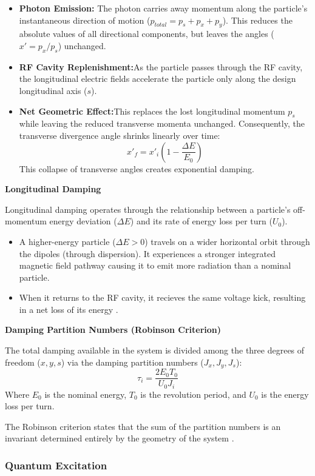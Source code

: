 \documentclass{article}
\begin{document}
\begin{itemize}
\item \textbf{Photon Emission:} The photon carries away momentum along the particle's instantaneous direction of motion ($p_{total}=p_s+p_x+p_y$). This reduces the absolute values of all directional components, but leaves the angles ($x'=p_x/p_s$) unchanged.
\item \textbf{RF Cavity Replenishment:}As the particle passes through the RF cavity, the longitudinal electric fields accelerate the particle only along the design longitudinal axis ($s$).
\item \textbf{Net Geometric Effect:}This replaces the lost longitudinal momentum $p_s$ while leaving the reduced transverse momenta unchanged. Consequently, the transverse divergence angle shrinks linearly over time: $$x'_f=x'_i(1-\frac{\Delta E}{E_0})$$ This collapse of transverse angles creates exponential damping. \cite{Wolski2014}
\end{itemize}

\textbf{Longitudinal Damping}


Longitudinal damping operates through the relationship between a particle's off-momentum energy deviation ($\Delta E$) and its rate of energy loss per turn ($U_0$).
\begin{itemize}
\item A higher-energy particle ($\Delta E > 0$) travels on a wider horizontal orbit through the dipoles (through dispersion). It experiences a stronger integrated magnetic field pathway causing it to emit more radiation than a nominal particle.
\item When it returns to the RF cavity, it recieves the same voltage kick, resulting in a net loss of its energy \cite{Sands1970, Jackson1999}.
\end{itemize}


\textbf{Damping Partition Numbers (Robinson Criterion)}

The total damping available in the system is divided among the three degrees of freedom ($x, y, s$) via the damping partition numbers ($J_x, J_y, J_s$):
$$\tau_i=\frac{2E_0T_0}{U_0 J_i}$$
Where $E_0$ is the nominal energy, $T_0$ is the revolution period, and $U_0$ is the energy loss per turn.

The Robinson criterion states that the sum of the partition numbers is an invariant determined entirely by the geometry of the system \cite{Robinson1958}.

\subsubsection{Quantum Excitation}
\end{document}
